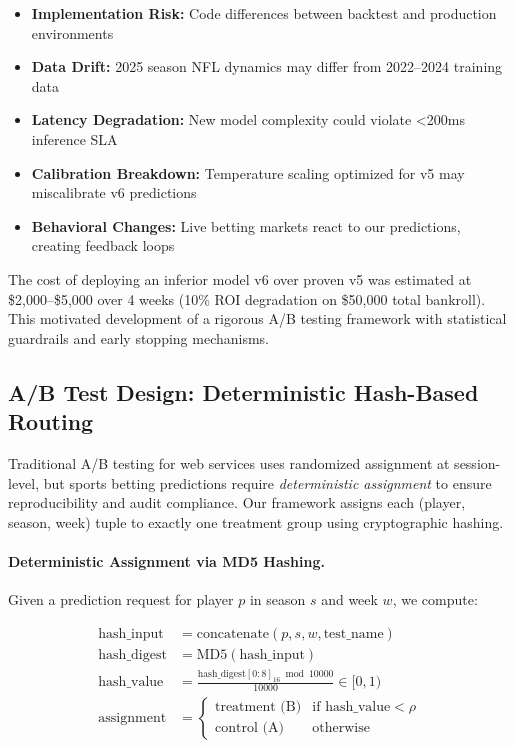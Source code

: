\begin{itemize}[itemsep=3pt,parsep=0pt]
    \item \textbf{Implementation Risk:} Code differences between backtest and production environments
    \item \textbf{Data Drift:} 2025 season NFL dynamics may differ from 2022--2024 training data
    \item \textbf{Latency Degradation:} New model complexity could violate <200ms inference SLA
    \item \textbf{Calibration Breakdown:} Temperature scaling optimized for v5 may miscalibrate v6 predictions
    \item \textbf{Behavioral Changes:} Live betting markets react to our predictions, creating feedback loops
\end{itemize}

The cost of deploying an inferior model v6 over proven v5 was estimated at \$2,000--\$5,000 over 4 weeks (10\% ROI degradation on \$50,000 total bankroll). This motivated development of a rigorous A/B testing framework with statistical guardrails and early stopping mechanisms.

\subsection{A/B Test Design: Deterministic Hash-Based Routing}

Traditional A/B testing for web services uses randomized assignment at session-level, but sports betting predictions require \emph{deterministic assignment} to ensure reproducibility and audit compliance. Our framework assigns each (player, season, week) tuple to exactly one treatment group using cryptographic hashing.

\paragraph{Deterministic Assignment via MD5 Hashing.}
Given a prediction request for player $p$ in season $s$ and week $w$, we compute:

\begin{equation}
\begin{aligned}
\text{hash\_input} &= \text{concatenate}(p, s, w, \text{test\_name}) \\
\text{hash\_digest} &= \text{MD5}(\text{hash\_input}) \\
\text{hash\_value} &= \frac{\text{hash\_digest}[0:8]_{16} \bmod 10000}{10000} \in [0, 1) \\
\text{assignment} &= \begin{cases}
\text{treatment (B)} & \text{if } \text{hash\_value} < \rho \\
\text{control (A)} & \text{otherwise}
\end{cases}
\end{aligned}
\label{eq:ab-test-hash-assignment}
\end{equation}

